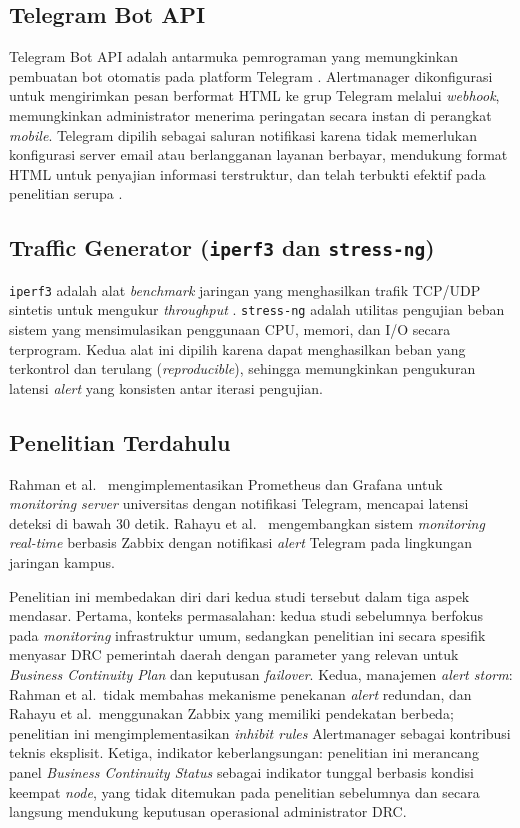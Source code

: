 \documentclass[10pt,twocolumn]{article}
\begin{document}
\subsection{Telegram Bot API}

Telegram Bot API adalah antarmuka pemrograman yang memungkinkan pembuatan bot otomatis pada platform
Telegram \cite{telegram2023}. Alertmanager dikonfigurasi untuk mengirimkan pesan berformat HTML ke
grup Telegram melalui \textit{webhook}, memungkinkan administrator menerima peringatan secara instan
di perangkat \textit{mobile}. Telegram dipilih sebagai saluran notifikasi karena tidak memerlukan
konfigurasi server email atau berlangganan layanan berbayar, mendukung format HTML untuk penyajian
informasi terstruktur, dan telah terbukti efektif pada penelitian serupa \cite{Rahman2020}.

\subsection{Traffic Generator (\texttt{iperf3} dan \texttt{stress-ng})}

\texttt{iperf3} adalah alat \textit{benchmark} jaringan yang menghasilkan trafik TCP/UDP sintetis
untuk mengukur \textit{throughput} \cite{Rahayu2025}. \texttt{stress-ng} adalah utilitas pengujian
beban sistem yang mensimulasikan penggunaan CPU, memori, dan I/O secara terprogram. Kedua alat ini
dipilih karena dapat menghasilkan beban yang terkontrol dan terulang (\textit{reproducible}), sehingga
memungkinkan pengukuran latensi \textit{alert} yang konsisten antar iterasi pengujian.

\subsection{Penelitian Terdahulu}

Rahman et al.\ \cite{Rahman2020} mengimplementasikan Prometheus dan Grafana untuk \textit{monitoring
server} universitas dengan notifikasi Telegram, mencapai latensi deteksi di bawah 30 detik. Rahayu
et al.\ \cite{Rahayu2025} mengembangkan sistem \textit{monitoring real-time} berbasis Zabbix dengan
notifikasi \textit{alert} Telegram pada lingkungan jaringan kampus.

Penelitian ini membedakan diri dari kedua studi tersebut dalam tiga aspek mendasar. Pertama, konteks
permasalahan: kedua studi sebelumnya berfokus pada \textit{monitoring} infrastruktur umum, sedangkan
penelitian ini secara spesifik menyasar DRC pemerintah daerah dengan parameter yang relevan untuk
\textit{Business Continuity Plan} dan keputusan \textit{failover}. Kedua, manajemen
\textit{alert storm}: Rahman et al.\ tidak membahas mekanisme penekanan \textit{alert} redundan, dan
Rahayu et al.\ menggunakan Zabbix yang memiliki pendekatan berbeda; penelitian ini
mengimplementasikan \textit{inhibit rules} Alertmanager sebagai kontribusi teknis eksplisit. Ketiga,
indikator keberlangsungan: penelitian ini merancang panel \textit{Business Continuity Status} sebagai
indikator tunggal berbasis kondisi keempat \textit{node}, yang tidak ditemukan pada penelitian
sebelumnya dan secara langsung mendukung keputusan operasional administrator DRC.
\end{document}
